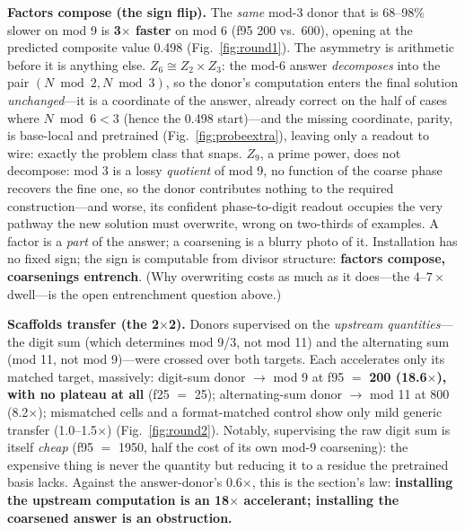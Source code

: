 \documentclass{article} %
\begin{document}
\textbf{Factors compose (the sign flip).} The \emph{same} mod-3 donor that is 68--98\% slower on mod 9 is \textbf{3$\times$ faster} on mod 6 (f95 200 vs.\ 600), opening at the predicted composite value 0.498 (Fig.~\ref{fig:round1}). The asymmetry is arithmetic before it is anything else. $Z_6 \cong Z_2 \times Z_3$: the mod-6 answer \emph{decomposes} into the pair $(N \bmod 2, N \bmod 3)$, so the donor's computation enters the final solution \emph{unchanged}---it is a coordinate of the answer, already correct on the half of cases where $N \bmod 6 < 3$ (hence the 0.498 start)---and the missing coordinate, parity, is base-local and pretrained (Fig.~\ref{fig:probeextra}), leaving only a readout to wire: exactly the problem class that snaps. $Z_9$, a prime power, does not decompose: mod 3 is a lossy \emph{quotient} of mod 9, no function of the coarse phase recovers the fine one, so the donor contributes nothing to the required construction---and worse, its confident phase-to-digit readout occupies the very pathway the new solution must overwrite, wrong on two-thirds of examples. A factor is a \emph{part} of the answer; a coarsening is a blurry photo of it. Installation has no fixed sign; the sign is computable from divisor structure: \textbf{factors compose, coarsenings entrench}. (Why overwriting costs as much as it does---the $4$--$7\times$ dwell---is the open entrenchment question above.)

\textbf{Scaffolds transfer (the 2$\times$2).} Donors supervised on the \emph{upstream quantities}---the digit sum (which determines mod 9/3, not mod 11) and the alternating sum (mod 11, not mod 9)---were crossed over both targets. Each accelerates only its matched target, massively: digit-sum donor $\to$ mod 9 at f95 $=$ \textbf{200 (18.6$\times$), with no plateau at all} (f25 $=$ 25); alternating-sum donor $\to$ mod 11 at 800 (8.2$\times$); mismatched cells and a format-matched control show only mild generic transfer (1.0--1.5$\times$) (Fig.~\ref{fig:round2}). Notably, supervising the raw digit sum is itself \emph{cheap} (f95 $=$ 1950, half the cost of its own mod-9 coarsening): the expensive thing is never the quantity but reducing it to a residue the pretrained basis lacks. Against the answer-donor's 0.6$\times$, this is the section's law: \textbf{installing the upstream computation is an 18$\times$ accelerant; installing the coarsened answer is an obstruction.}
\end{document}

